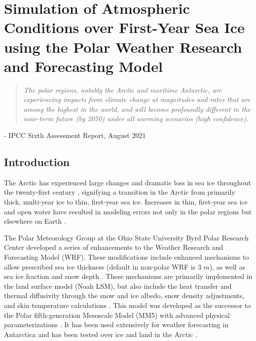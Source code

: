 \chapter{Simulation of Atmospheric Conditions over First-Year Sea Ice using the Polar Weather Research and Forecasting Model}
\vspace{1 cm}
\begin{spacing}{1} \begin{quote} 
\noindent \emph{The polar regions, notably the Arctic and maritime Antarctic, are experiencing impacts from climate change at magnitudes and rates that are among the highest in the world, and will become profoundly different in the near-term future (by 2050) under all warming scenarios (high confidence).}\end{quote}
\hspace{6 cm} - IPCC Sixth Assessment Report, August 2021  
\end{spacing}
\doublespacing
\section{Introduction}
The Arctic has experienced large changes and dramatic loss in sea ice throughout the twenty-first century \citep{hines:2015}, signifying a transition in the Arctic from primarily thick, multi-year ice to thin, first-year sea ice. Increases in thin, first-year sea ice and open water have resulted in modeling errors not only in the polar regions but elsewhere on Earth \citep{hines:2015, royer:1990, francis:2009}. 

The Polar Meteorology Group at the Ohio State University Byrd Polar Research Center developed a series of enhancements to the Weather Research and Forecasting Model (WRF). These modifications include enhanced mechanisms to allow prescribed sea ice thickness (default in non-polar WRF is 3 $m$), as well as sea ice fraction and snow depth \citep{hines:2015}. These mechanisms are primarily implemented in the land surface model (Noah LSM), but also include the heat transfer and thermal diffusivity through the snow and ice albedo, snow density adjustments, and skin temperature calculations \citep{tastula:2012, hines:2015}. This model was developed as the successor to the Polar fifth-generation Mesoscale Model (MM5) with advanced physical parameterizations \citep{bromwich:2009}. It has been used extensively for weather forecasting in Antarctica \citep{powers:2012} and has been tested over ice and land in the Arctic \citep{tastula:2012, bromwich:2009}. 

